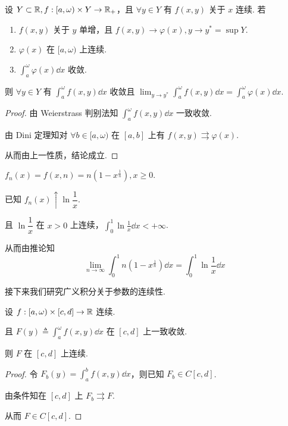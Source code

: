 \begin{inference}\label{1722}
    设 $Y\subset\mathbb{R},f:[a,\omega)\times Y\to\mathbb{R}_+$，且 $\forall y\in Y$ 有 $f(x,y)$ 关于 $x$ 连续. 若

    \begin{enumerate}
        \item $f(x,y)$ 关于 $y$ 单增，且 $f(x,y)\to\varphi(x),y\to y^*=\sup Y$.
            
        \item $\varphi(x)$ 在 $[a,\omega)$ 上连续.
            
        \item $\displaystyle\int_a^\omega\varphi(x)\dd x$ 收敛.
    \end{enumerate}

    则 $\forall y\in Y$ 有 $\displaystyle\int_a^\omega f(x,y)\dd x$ 收敛且 $\displaystyle\lim_{y\to y^*}\int_a^\omega f(x,y)\dd x=\int_a^\omega\varphi(x)\dd x$.
\end{inference}
\begin{proof}
    由 Weierstrass 判别法知 $\displaystyle\int_a^\omega f(x,y)\dd x$ 一致收敛.

    由 Dini 定理知对 $\forall b\in[a,\omega)$ 在 $[a,b]$ 上有 $f(x,y)\rightrightarrows\varphi(x)$.

    从而由上一性质，结论成立.
\end{proof}

\begin{example}
    $f_n(x)=f(x,n)=n(1-x^\frac{1}{n}),x\ge 0$.

    已知 $f_n(x)\uparrow\ln\dfrac{1}{x}$.

    且 $\ln\dfrac{1}{x}$ 在 $x>0$ 上连续，$\displaystyle\int_0^1\ln\frac{1}{x}\dd x<+\infty$.

    从而由推论知
$$
\lim_{n\to\infty}\int_0^1n(1-x^\frac{1}{n})\dd x=\int_0^1\ln\frac{1}{x}\dd x
$$
\end{example}

接下来我们研究广义积分关于参数的连续性.

\begin{property}
    设 $f:[a,\omega)\times [c,d]\to\mathbb{R}$ 连续.

    且 $F(y)\triangleq\displaystyle\int_a^\omega f(x,y)\dd x$ 在 $[c,d]$ 上一致收敛.
    
    则 $F$ 在 $[c,d]$ 上连续.
\end{property}
\begin{proof}
    令 $F_b(y)=\displaystyle\int_a^b f(x,y)\dd x$，则已知 $F_b\in C[c,d]$.

    由条件知在 $[c,d]$ 上 $F_b\rightrightarrows F$.

    从而 $F\in C[c,d]$.
\end{proof}


